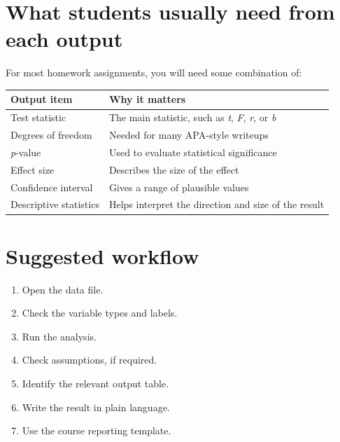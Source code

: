 \documentclass[
  letterpaper,
  DIV=11,
  numbers=noendperiod]{scrreprt}
\newcounter{none} %
\providecommand{\tightlist}{%
  \setlength{\itemsep}{0pt}\setlength{\parskip}{0pt}}
\begin{document}
\section*{What students usually need from each
output}\label{what-students-usually-need-from-each-output}


For most homework assignments, you will need some combination of:

{\def\LTcaptype{none} %
\begin{longtable}[]{@{}
  >{\raggedright\arraybackslash}p{}
  >{\raggedright\arraybackslash}p{}@{}}
\toprule\noalign{}
\begin{minipage}[b]{\linewidth}\raggedright
Output item
\end{minipage} & \begin{minipage}[b]{\linewidth}\raggedright
Why it matters
\end{minipage} \\
\midrule\noalign{}
\endhead
\bottomrule\noalign{}
\endlastfoot
Test statistic & The main statistic, such as \emph{t}, \emph{F},
\emph{r}, or \emph{b} \\
Degrees of freedom & Needed for many APA-style writeups \\
\emph{p}-value & Used to evaluate statistical significance \\
Effect size & Describes the size of the effect \\
Confidence interval & Gives a range of plausible values \\
Descriptive statistics & Helps interpret the direction and size of the
result \\
\end{longtable}
}

\section*{Suggested workflow}\label{suggested-workflow}


\begin{enumerate}
\def\labelenumi{\arabic{enumi}.}
\tightlist
\item
  Open the data file.
\item
  Check the variable types and labels.
\item
  Run the analysis.
\item
  Check assumptions, if required.
\item
  Identify the relevant output table.
\item
  Write the result in plain language.
\item
  Use the course reporting template.
\end{enumerate}
\end{document}
